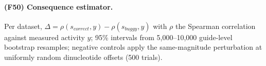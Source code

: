 \paragraph{(F50) Consequence estimator.} Per dataset, $\Delta=\rho(s_{correct},y)-\rho(s_{buggy},y)$ with $\rho$ the Spearman correlation against measured activity $y$; 95\% intervals from 5,000--10,000 guide-level bootstrap resamples; negative controls apply the same-magnitude perturbation at uniformly random dinucleotide offsets (500 trials).
